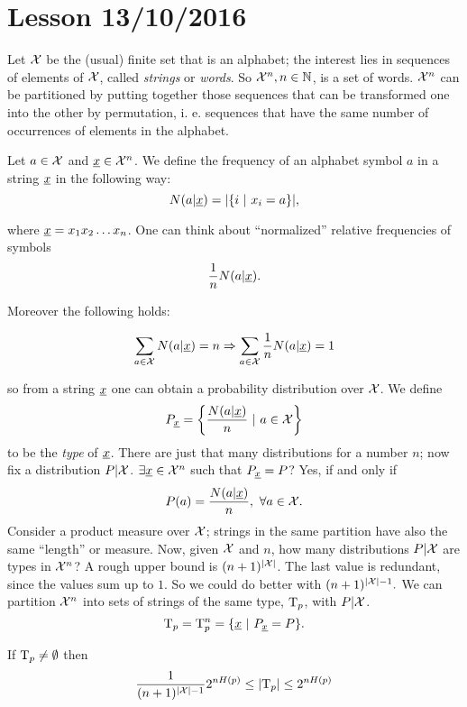 \section{Lesson 13/10/2016}

Let $\mathcal{X}$ be the (usual) finite set that is an alphabet; the interest lies in sequences of elements of $\mathcal{X}$, called \emph{strings} or \emph{words}. So $\mathcal{X}^n, n \in \mathbb{N}$, is a set of words. $\mathcal{X}^n$ can be partitioned by putting together those sequences that can be transformed one into the other by permutation, i. e. sequences that have the same number of occurrences of elements in the alphabet.

Let $a \in \mathcal{X}$ and $\underline{x} \in \mathcal{X}^n$. We define the frequency of an alphabet symbol $a$ in a string $\underline{x}$ in the following way:  
\begin{equation}
N(a | \underline{x}) = |\{i\ |\ x_i = a\}|,
\end{equation}

where $\underline{x} = x_1x_2\ldots x_n$. One can think about ``normalized'' relative frequencies of symbols $$\dfrac{1}{n} N(a|\underline{x}).$$

Moreover the following holds:

$$\sum_{a \in \mathcal{X}} N(a|\underline{x}) = n \Rightarrow \sum_{a\in \mathcal{X}} \dfrac{1}{n}N(a|\underline{x}) = 1$$

so from a string $\underline{x}$ one can obtain a probability distribution over $\mathcal{X}$. We define
\begin{equation}
	P_{\str{x}} = \left\{ \dfrac{N(a|\str{x})}{n}\ |\ a \in \xset \right\}
\end{equation}
to be the \emph{type} of $\underline{x}$. There are just that many distributions for a number $n$; now fix a distribution $P|\mathcal{X}$. $\exists \underline{x} \in \mathcal{X}^n$ such that  $P_{\underline{x}} = P$? Yes, if and only if
$$P(a) = \dfrac{N(a | \underline{x})}{n},\ \forall a \in \mathcal{X}.$$ Consider a product measure over $\mathcal{X}$; strings in the same partition have also the same ``length'' or measure. Now, given $\mathcal{X}$ and $n$, how many distributions $P|\mathcal{X}$ are types in $\mathcal{X}^n$? A rough upper bound is $(n + 1)^{|\mathcal{X}|}$. The last value is redundant, since the values sum up to $1$. So we could do better with $(n + 1)^{|\mathcal{X}| - 1}.$ We can partition $\mathcal{X}^n$ into sets of strings of the same type, $\mathrm{T}_p$, with $P|\mathcal{X}$. $$\mathrm{T}_p = \mathrm{T}_p^n = \{\underline{x}\ |\ P_{\underline{x}} = P\}.$$

\begin{thm} \label{thms:taupcard}
	If $\mathrm{T}_p \not= \emptyset$ then $$\dfrac{1}{(n+1)^{|\mathcal{X}| -1}}2^{nH(p)}\leq |\mathrm{T}_p| \leq 2^{nH(p)}$$
\end{thm}

